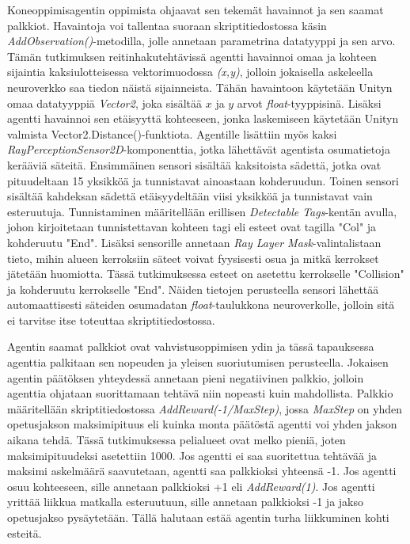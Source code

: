 \documentclass[utf8]{gradu3}
\begin{document}
Koneoppimisagentin oppimista ohjaavat sen tekemät havainnot ja sen saamat palkkiot. Havaintoja voi tallentaa suoraan skriptitiedostossa käsin \textit{AddObservation()}-metodilla, jolle annetaan parametrina datatyyppi ja sen arvo. Tämän tutkimuksen reitinhakutehtävissä agentti havainnoi omaa ja kohteen sijaintia kaksiulotteisessa vektorimuodossa \textit{(x,y)}, jolloin jokaisella askeleella neuroverkko saa tiedon näistä sijainneista. Tähän havaintoon käytetään Unityn omaa datatyyppiä \textit{Vector2}, joka sisältää \(x\) ja \(y\) arvot \textit{float}-tyyppisinä. Lisäksi agentti havainnoi sen etäisyyttä kohteeseen, jonka laskemiseen käytetään Unityn valmista Vector2.Distance()-funktiota. Agentille lisättiin myös kaksi \textit{RayPerceptionSensor2D}-komponenttia, jotka lähettävät agentista osumatietoja kerääviä säteitä. Ensimmäinen sensori sisältää kaksitoista sädettä, jotka ovat pituudeltaan 15 yksikköä ja tunnistavat ainoastaan kohderuudun. Toinen sensori sisältää kahdeksan sädettä etäisyydeltään viisi yksikköä ja tunnistavat vain esteruutuja. Tunnistaminen määritellään erillisen \textit{Detectable Tags}-kentän avulla, johon kirjoitetaan tunnistettavan kohteen tagi eli esteet ovat tagilla "Col" ja kohderuutu "End". Lisäksi sensorille annetaan \textit{Ray Layer Mask}-valintalistaan tieto, mihin alueen kerroksiin säteet voivat fyysisesti osua ja mitkä kerrokset jätetään huomiotta. Tässä tutkimuksessa esteet on asetettu kerrokselle "Collision" ja kohderuutu kerrokselle "End". Näiden tietojen perusteella sensori lähettää automaattisesti säteiden osumadatan \textit{float}-taulukkona neuroverkolle, jolloin sitä ei tarvitse itse toteuttaa skriptitiedostossa.

Agentin saamat palkkiot ovat vahvistusoppimisen ydin ja tässä tapauksessa agenttia palkitaan sen nopeuden ja yleisen suoriutumisen perusteella. Jokaisen agentin päätöksen yhteydessä annetaan pieni negatiivinen palkkio, jolloin agenttia ohjataan suorittamaan tehtävä niin nopeasti kuin mahdollista. Palkkio määritellään skriptitiedostossa \textit{AddReward(-1/MaxStep)}, jossa \textit{MaxStep} on yhden opetusjakson maksimipituus eli kuinka monta päätöstä agentti voi yhden jakson aikana tehdä. Tässä tutkimuksessa pelialueet ovat melko pieniä, joten maksimipituudeksi asetettiin 1000. Jos agentti ei saa suoritettua tehtävää ja maksimi askelmäärä saavutetaan, agentti saa palkkioksi yhteensä -1. Jos agentti osuu kohteeseen, sille annetaan palkkioksi +1 eli \textit{AddReward(1)}. Jos agentti yrittää liikkua matkalla esteruutuun, sille annetaan palkkioksi -1 ja jakso opetusjakso pysäytetään. Tällä halutaan estää agentin turha liikkuminen kohti esteitä.
\end{document}
